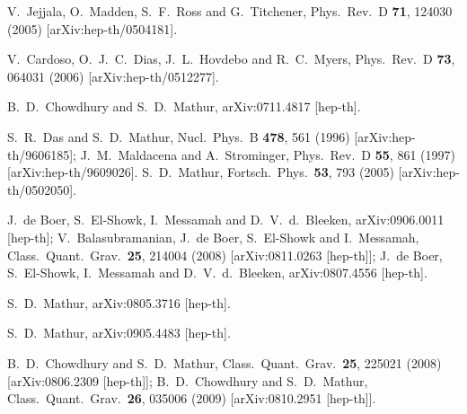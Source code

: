 \documentclass[12pt]{article}
\begin{document}
\begin{thebibliography}{99}
  V.~Jejjala, O.~Madden, S.~F.~Ross and G.~Titchener,
  Phys.\ Rev.\  D {\bf 71}, 124030 (2005)
  [arXiv:hep-th/0504181].
  
  V.~Cardoso, O.~J.~C.~Dias, J.~L.~Hovdebo and R.~C.~Myers,
  Phys.\ Rev.\  D {\bf 73}, 064031 (2006)
  [arXiv:hep-th/0512277].

  B.~D.~Chowdhury and S.~D.~Mathur,
  arXiv:0711.4817 [hep-th].

S.~R.~Das and S.~D.~Mathur,
Nucl.\ Phys.\ B {\bf 478}, 561 (1996)
[arXiv:hep-th/9606185];
J.~M.~Maldacena and A.~Strominger,
Phys.\ Rev.\ D {\bf 55}, 861 (1997)
[arXiv:hep-th/9609026].
%
  S.~D.~Mathur,
  Fortsch.\ Phys.\  {\bf 53}, 793 (2005)
  [arXiv:hep-th/0502050].

  J.~de Boer, S.~El-Showk, I.~Messamah and D.~V.~d.~Bleeken,
  arXiv:0906.0011 [hep-th];
V.~Balasubramanian, J.~de Boer, S.~El-Showk and I.~Messamah,
  Class.\ Quant.\ Grav.\  {\bf 25}, 214004 (2008)
  [arXiv:0811.0263 [hep-th]];
J.~de Boer, S.~El-Showk, I.~Messamah and D.~V.~d.~Bleeken,
  arXiv:0807.4556 [hep-th].

  S.~D.~Mathur,
  arXiv:0805.3716 [hep-th].

  S.~D.~Mathur,
  arXiv:0905.4483 [hep-th].
  
  B.~D.~Chowdhury and S.~D.~Mathur,
  Class.\ Quant.\ Grav.\  {\bf 25}, 225021 (2008)
  [arXiv:0806.2309 [hep-th]];
B.~D.~Chowdhury and S.~D.~Mathur,
  Class.\ Quant.\ Grav.\  {\bf 26}, 035006 (2009)
  [arXiv:0810.2951 [hep-th]].





\end{thebibliography}
\end{document}
